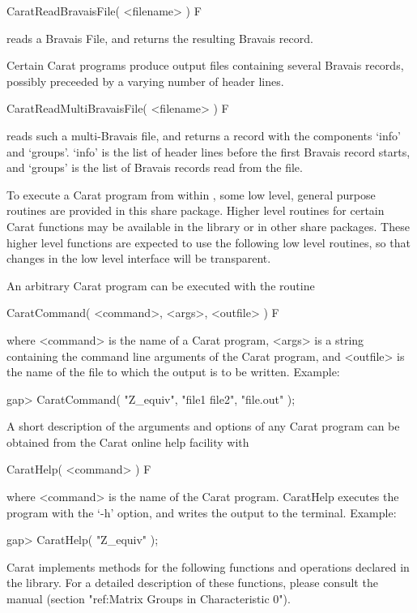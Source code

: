 \>CaratReadBravaisFile( <filename> ) F

reads a Bravais File, and returns the resulting Bravais record.

Certain Carat programs produce output files containing several Bravais 
records, possibly preceeded by a varying number of header lines.

\>CaratReadMultiBravaisFile( <filename> ) F

reads such a multi-Bravais file, and returns a record with the components
`info' and `groups'. `info' is the list of header lines before the first
Bravais record starts, and `groups' is the list of Bravais records read from
the file.


To execute a Carat program from within {\GAP}, some low level,
general purpose routines are provided in this share package. 
Higher level routines for certain Carat functions may be available 
in the {\GAP} library or in other share packages. These higher
level functions are expected to use the following low level routines,
so that changes in the low level interface will be transparent. 

An arbitrary Carat program can be executed with the routine

\>CaratCommand( <command>, <args>, <outfile> ) F

where <command> is the name of a Carat program, <args> is a string
containing the command line arguments of the Carat program,
and <outfile> is the name of the file to which the output is to be 
written. Example:

\beginexample
    gap> CaratCommand( "Z_equiv", "file1 file2", "file.out" );
\endexample

A short description of the arguments and options of any Carat 
program can be obtained from the Carat online help facility with

\>CaratHelp( <command> ) F

where <command> is the name of the Carat program. CaratHelp executes
the program with the `-h' option, and writes the output to the 
terminal. Example:

\beginexample
    gap> CaratHelp( "Z_equiv" );
\endexample


Carat implements methods for the following functions and operations
declared in the {\GAP} library. For a detailed description of these
functions, please consult the {\GAP} manual (section "ref:Matrix Groups
in Characteristic 0").

